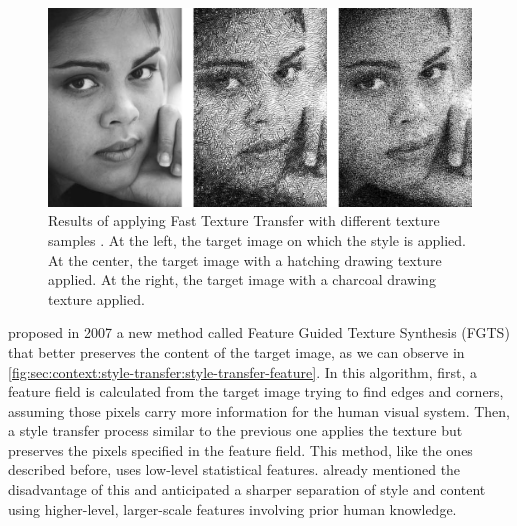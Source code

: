 \begin{figure}[t]
  \includegraphics[width=\textwidth]{gfx/style-transfer-fast-texture}
  \caption{
    Results of applying Fast Texture Transfer with different texture samples \cite{Ashikhmin2003}.
    At the left, the target image on which the style is applied.
    At the center, the target image with a hatching drawing texture applied.
    At the right, the target image with a charcoal drawing texture applied.
  }
  \label{fig:sec:context:style-transfer:style-transfer-analogy}
\end{figure}

\citet{Xie2007} proposed in 2007 a new method called Feature Guided Texture Synthesis (FGTS) that better preserves the content of the target image, as we can observe in \autoref{fig:sec:context:style-transfer:style-transfer-feature}.
In this algorithm, first, a feature field is calculated from the target image trying to find edges and corners, assuming those pixels carry more information for the human visual system.
Then, a style transfer process similar to the previous one applies the texture but preserves the pixels specified in the feature field.
This method, like the ones described before, uses low-level statistical features.
\citeauthor{Xie2007} already mentioned the disadvantage of this and anticipated a sharper separation of style and content using higher-level, larger-scale features involving prior human knowledge.

